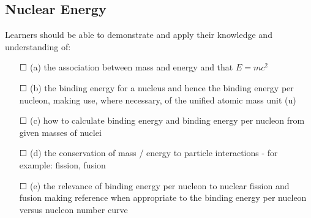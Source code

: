 \subsection{Nuclear Energy}Learners should be able to demonstrate and apply their knowledge and
understanding of:
\begin{itemize}
	\item[\Large{$\Square$}] (a) the association between mass and energy and that \(E = mc^{2}\)
	\item[\Large{$\Square$}]	(b) the binding energy for a nucleus and hence the binding energy per nucleon, making use, where necessary, of the unified atomic mass unit (u)
	\item[\Large{$\Square$}]	(c) how to calculate binding energy and binding energy per nucleon from given masses of nuclei
	\item[\Large{$\Square$}]	(d) the conservation of mass / energy to particle interactions - for example: fission, fusion
	\item[\Large{$\Square$}]	(e) the relevance of binding energy per nucleon to nuclear \sq fission and \sq fusion making reference when appropriate to the binding energy per nucleon versus nucleon number curve
\end{itemize}
